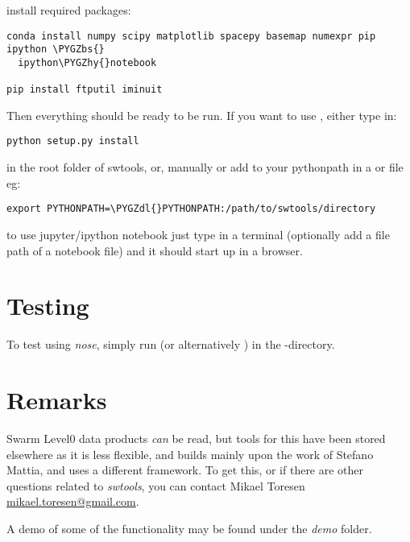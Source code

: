 \documentclass[letterpaper,10pt,english]{sphinxhowto}
\def\PYGZbs{\char`\\}
\def\PYGZdl{\char`\$}
\def\PYGZhy{\char`\-}
\begin{document}
install required packages:

\begin{Verbatim}[commandchars=\\\{\}]
conda install numpy scipy matplotlib spacepy basemap numexpr pip ipython \PYGZbs{}
  ipython\PYGZhy{}notebook

pip install ftputil iminuit
\end{Verbatim}

Then everything should be ready to be run. If you want to use , either type in:

\begin{Verbatim}[commandchars=\\\{\}]
python setup.py install
\end{Verbatim}

in the root folder of swtools, or, manually or add  to your pythonpath in a  or  file eg:

\begin{Verbatim}[commandchars=\\\{\}]
export PYTHONPATH=\PYGZdl{}PYTHONPATH:/path/to/swtools/directory
\end{Verbatim}

to use jupyter/ipython notebook just type  in a terminal (optionally add a file path of a notebook file) and it should start up in a browser.


\section{Testing}
\label{test::doc}\label{test:testing}\label{test:test}
To test  using \emph{nose}, simply run  (or alternatively  ) in the -directory.


\section{Remarks}
\label{remarks:remarks}\label{remarks::doc}
Swarm Level0 data products \emph{can} be read, but tools for this have been stored elsewhere as it is less flexible, and builds mainly upon the work of Stefano Mattia, and uses a different framework. To get this, or if there are other questions related to \emph{swtools}, you can contact Mikael Toresen \href{mailto:mikael.toresen@gmail.com}{mikael.toresen@gmail.com}.

A demo of some of the functionality may be found under the \emph{demo} folder.



\renewcommand{\indexname}{Index}
\printindex
\end{document}
